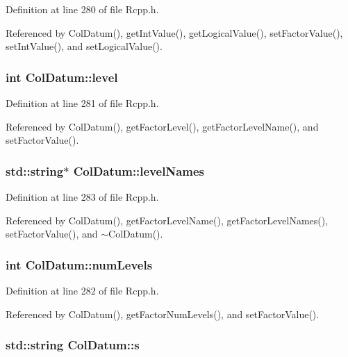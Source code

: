 Definition at line 280 of file Rcpp.h.

Referenced by ColDatum(), getIntValue(), getLogicalValue(), setFactorValue(), setIntValue(), and setLogicalValue().\hypertarget{classColDatum_a7b0fc92a094e9d1a865fd84c939170d0}{
\subsubsection[{level}]{\setlength{\rightskip}{0pt plus 5cm}int {\bf ColDatum::level}}}
\label{classColDatum_a7b0fc92a094e9d1a865fd84c939170d0}


Definition at line 281 of file Rcpp.h.

Referenced by ColDatum(), getFactorLevel(), getFactorLevelName(), and setFactorValue().\hypertarget{classColDatum_a2abac3c574e1ab36531b03849197f779}{
\subsubsection[{levelNames}]{\setlength{\rightskip}{0pt plus 5cm}std::string$\ast$ {\bf ColDatum::levelNames}}}
\label{classColDatum_a2abac3c574e1ab36531b03849197f779}


Definition at line 283 of file Rcpp.h.

Referenced by ColDatum(), getFactorLevelName(), getFactorLevelNames(), setFactorValue(), and $\sim$ColDatum().\hypertarget{classColDatum_a42954a262993eee014db2d1fd7a7c34f}{
\subsubsection[{numLevels}]{\setlength{\rightskip}{0pt plus 5cm}int {\bf ColDatum::numLevels}}}
\label{classColDatum_a42954a262993eee014db2d1fd7a7c34f}


Definition at line 282 of file Rcpp.h.

Referenced by ColDatum(), getFactorNumLevels(), and setFactorValue().\hypertarget{classColDatum_a5a1c85e1da2da02052078a3c8d810be9}{
\subsubsection[{s}]{\setlength{\rightskip}{0pt plus 5cm}std::string {\bf ColDatum::s}}}
\label{classColDatum_a5a1c85e1da2da02052078a3c8d810be9}


